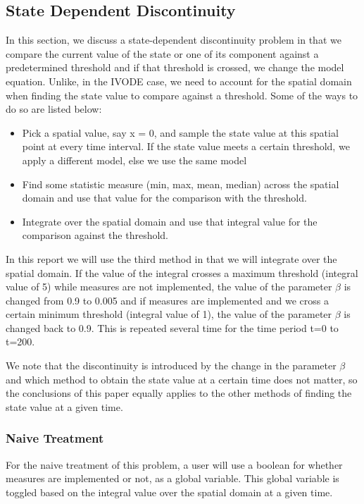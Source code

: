 \documentclass{article}
\begin{document}
\subsection{State Dependent Discontinuity}
In this section, we discuss a state-dependent discontinuity problem in that we compare the current value of the state or one of its component against a predetermined threshold and if that threshold is crossed, we change the model equation. Unlike, in the IVODE case, we need to account for the spatial domain when finding the state value to compare against a threshold. Some of the ways to do so are listed below:
\begin{itemize}
\item Pick a spatial value, say x = 0, and sample the state value at this spatial point at every time interval. If the state value meets a certain threshold, we apply a different model, else we use the same model

\item Find some statistic measure (min, max, mean, median) across the spatial domain and use that value for the comparison with the threshold.

\item Integrate over the spatial domain and use that integral value for the comparison against the threshold.
\end{itemize}

In this report we will use the third method in that we will integrate over the spatial domain. If the value of the integral crosses a maximum threshold (integral value of 5) while measures are not implemented, the value of the parameter $\beta$ is changed from 0.9 to 0.005 and if measures are implemented and we cross a certain minimum threshold (integral value of 1), the value of the parameter $\beta$ is changed back to 0.9. This is repeated several time for the time period t=0 to t=200.  

We note that the discontinuity is introduced by the change in the parameter $\beta$ and which method to obtain the state value at a certain time does not matter, so the conclusions of this paper equally applies to the other methods of finding the state value at a given time.
 
\subsubsection{Naive Treatment}
For the naive treatment of this problem, a user will use a boolean for whether measures are implemented or not, as a global variable. This global variable is toggled based on the integral value over the spatial domain at a given time.  
\end{document}
